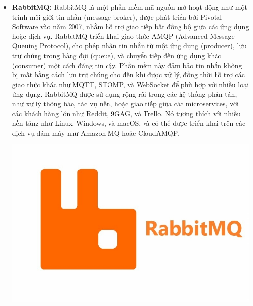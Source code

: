 \begin{itemize}
    \item \textbf{RabbitMQ:} RabbitMQ là một phần mềm mã nguồn mở hoạt động như một trình môi giới tin nhắn (message broker), được phát triển bởi Pivotal Software vào năm 2007, nhằm hỗ trợ giao tiếp bất đồng bộ giữa các ứng dụng hoặc dịch vụ. RabbitMQ triển khai giao thức AMQP (Advanced Message Queuing Protocol), cho phép nhận tin nhắn từ một ứng dụng (producer), lưu trữ chúng trong hàng đợi (queue), và chuyển tiếp đến ứng dụng khác (consumer) một cách đáng tin cậy. Phần mềm này đảm bảo tin nhắn không bị mất bằng cách lưu trữ chúng cho đến khi được xử lý, đồng thời hỗ trợ các giao thức khác như MQTT, STOMP, và WebSocket để phù hợp với nhiều loại ứng dụng. RabbitMQ được sử dụng rộng rãi trong các hệ thống phân tán, như xử lý thông báo, tác vụ nền, hoặc giao tiếp giữa các microservices, với các khách hàng lớn như Reddit, 9GAG, và Trello. Nó tương thích với nhiều nền tảng như Linux, Windows, và macOS, và có thể được triển khai trên các dịch vụ đám mây như Amazon MQ hoặc CloudAMQP.

    \includegraphics[width=\textwidth]{img/rabitmq.png}
\end{itemize}

